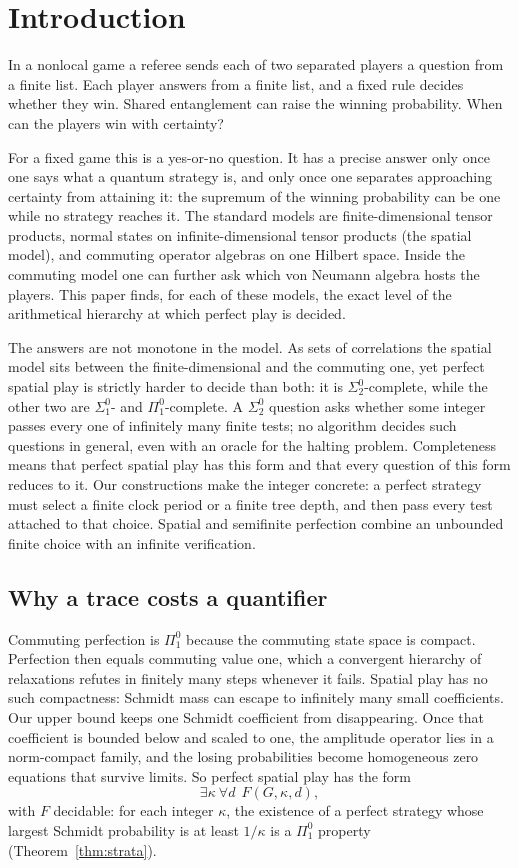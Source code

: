\section{Introduction}\label{sec:intro}
In a nonlocal game a referee sends each of two separated players a question from a finite list. Each player answers from a finite list, and a fixed rule decides whether they win. Shared entanglement can raise the winning probability. When can the players win with certainty?

For a fixed game this is a yes-or-no question. It has a precise answer only once one says what a quantum strategy is, and only once one separates approaching certainty from attaining it: the supremum of the winning probability can be one while no strategy reaches it. The standard models are finite-dimensional tensor products, normal states on infinite-dimensional tensor products (the spatial model), and commuting operator algebras on one Hilbert space. Inside the commuting model one can further ask which von Neumann algebra hosts the players. This paper finds, for each of these models, the exact level of the arithmetical hierarchy at which perfect play is decided.

The answers are not monotone in the model. As sets of correlations the spatial model sits between the finite-dimensional and the commuting one, yet perfect spatial play is strictly harder to decide than both: it is $\Sigma^0_2$-complete, while the other two are $\Sigma^0_1$- and $\Pi^0_1$-complete. A $\Sigma^0_2$ question asks whether some integer passes every one of infinitely many finite tests; no algorithm decides such questions in general, even with an oracle for the halting problem. Completeness means that perfect spatial play has this form and that every question of this form reduces to it. Our constructions make the integer concrete: a perfect strategy must select a finite clock period or a finite tree depth, and then pass every test attached to that choice. Spatial and semifinite perfection combine an unbounded finite choice with an infinite verification.

\subsection{Why a trace costs a quantifier}\label{sec:picture}
Commuting perfection is $\Pi^0_1$ because the commuting state space is compact. Perfection then equals commuting value one, which a convergent hierarchy of relaxations refutes in finitely many steps whenever it fails. Spatial play has no such compactness: Schmidt mass can escape to infinitely many small coefficients. Our upper bound keeps one Schmidt coefficient from disappearing. Once that coefficient is bounded below and scaled to one, the amplitude operator lies in a norm-compact family, and the losing probabilities become homogeneous zero equations that survive limits. So perfect spatial play has the form
\[
\exists\kappa\ \forall d\ \ F(G,\kappa,d),
\]
with $F$ decidable: for each integer $\kappa$, the existence of a perfect strategy whose largest Schmidt probability is at least $1/\kappa$ is a $\Pi^0_1$ property (Theorem~\ref{thm:strata}).

